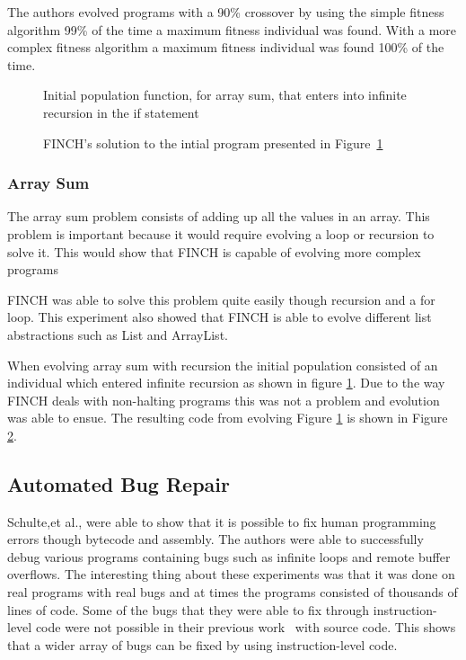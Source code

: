 \documentclass{sig-alternate}
\begin{document}
The authors evolved programs with a 90\% crossover by using the simple fitness algorithm 99\% of the time a maximum fitness individual was found. With a more complex fitness algorithm a maximum fitness individual was found 100\% of the time.


\begin{figure}
\centering
{}
\caption{Initial population function, for array sum, that enters into infinite recursion in the if statement}
\label{initial rec}
\end{figure}

\begin{figure}
\centering
{}
\caption{FINCH's solution to the intial program presented in Figure~\ref{initial rec}}
\label{final rec}
\end{figure}

\subsubsection{Array Sum}
The array sum problem consists of adding up all the values in an array. This problem is important because it would require evolving a loop or recursion to solve it. This would show that FINCH is capable of evolving more complex programs\par
FINCH was able to solve this problem quite easily though recursion and a for loop. This experiment also showed that FINCH is able to evolve different list abstractions such as List and ArrayList.

When evolving array sum with recursion the initial population consisted of an individual which entered infinite recursion as shown in figure \ref{initial rec}. Due to the way FINCH deals with non-halting programs this was not a problem and evolution was able to ensue. The resulting code from evolving Figure \ref{initial rec} is shown in Figure \ref{final rec}.


\subsection{Automated Bug Repair}

Schulte,et al., were able to show that it is possible to fix human programming errors though bytecode and assembly. The authors were able to successfully debug various programs containing bugs such as infinite loops and remote buffer overflows. The interesting thing about these experiments was that it was done on real programs with real bugs and at times the programs consisted of thousands of lines of code. Some of the bugs that they were able to fix through instruction-level code were not possible in their previous work~\cite{Forrest:2009} with source code. This shows that a wider array of bugs can be fixed by using instruction-level code.
\end{document}
